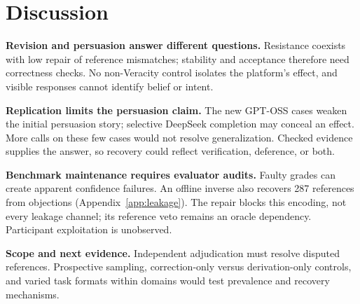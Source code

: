 \section{Discussion}
\label{sec:discussion}
\textbf{Revision and persuasion answer different questions.}
Resistance coexists with low repair of reference mismatches; stability and
acceptance therefore need correctness checks. No non-Veracity control isolates
the platform's effect, and visible responses cannot identify belief or intent.

\textbf{Replication limits the persuasion claim.}
The new GPT-OSS cases weaken the initial persuasion story; selective DeepSeek
completion may conceal an effect. More calls on these few cases would not
resolve generalization. Checked evidence supplies the answer, so recovery
could reflect verification, deference, or both.

\textbf{Benchmark maintenance requires evaluator audits.}
Faulty grades can create apparent confidence failures. An offline inverse
also recovers 287 references from objections (Appendix~\ref{app:leakage}).
The repair blocks this encoding, not every leakage channel; its reference
veto remains an oracle dependency. Participant exploitation is unobserved.

\textbf{Scope and next evidence.}
Independent adjudication must resolve disputed references. Prospective
sampling, correction-only versus derivation-only controls, and varied task
formats within domains would test prevalence and recovery mechanisms.
